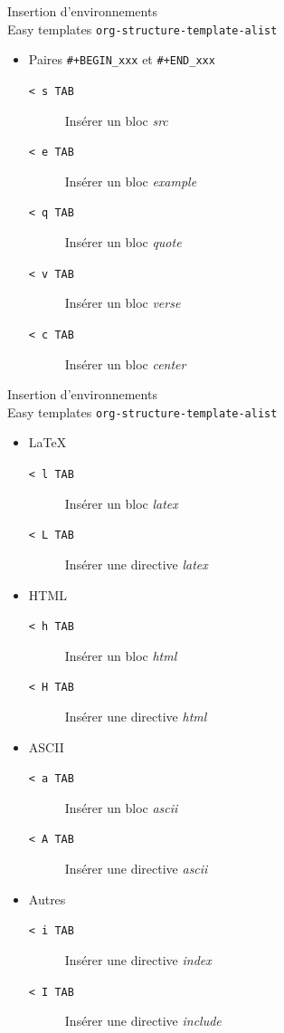 \documentclass[presentation,t,hideothersubsections]{beamer}
\begin{document}
\begin{frame}[fragile,label=sec-3-8-1]{Insertion d'environnements \\ Easy templates \texttt{org-structure-template-alist}}
 \begin{itemize}
\item Paires \texttt{\#+BEGIN\_xxx} et \texttt{\#+END\_xxx}
\begin{description}
\item[\texttt{< s TAB}] Insérer un bloc \emph{src}
\item[\texttt{< e TAB}] Insérer un bloc \emph{example}
\item[\texttt{< q TAB}] Insérer un bloc \emph{quote}
\item[\texttt{< v TAB}] Insérer un bloc \emph{verse}
\item[\texttt{< c TAB}] Insérer un bloc \emph{center}
\end{description}
\end{itemize}
\end{frame}
\begin{frame}[fragile,label=sec-3-8-2]{Insertion d'environnements \\ Easy templates \texttt{org-structure-template-alist}}
 \begin{itemize}
\item \LaTeX{}
\begin{description}
\item[\texttt{< l TAB}] Insérer un bloc \emph{latex}
\item[\texttt{< L TAB}] Insérer une directive \emph{latex}
\end{description}

\item HTML
\begin{description}
\item[\texttt{< h TAB}] Insérer un bloc \emph{html}
\item[\texttt{< H TAB}] Insérer une directive \emph{html}
\end{description}

\item ASCII
\begin{description}
\item[\texttt{< a TAB}] Insérer un bloc \emph{ascii}
\item[\texttt{< A TAB}] Insérer une directive \emph{ascii}
\end{description}

\item Autres
\begin{description}
\item[\texttt{< i TAB}] Insérer une directive \emph{index}
\item[\texttt{< I TAB}] Insérer une directive \emph{include}
\end{description}
\end{itemize}
\end{frame}
\end{document}
